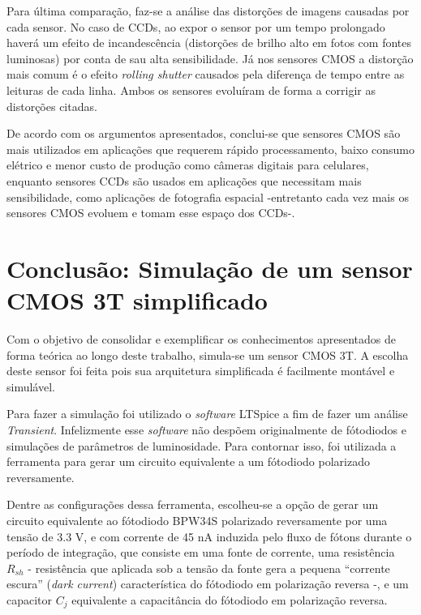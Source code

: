 \documentclass[10pt,a4paper,twocolumn]{article}
\begin{document}
	Para última comparação, faz-se a análise das distorções de imagens causadas por cada sensor. No caso de CCDs, ao expor o sensor por um tempo prolongado haverá um efeito de incandescência (distorções de brilho alto em fotos com fontes luminosas) por conta de sau alta sensibilidade. Já nos sensores CMOS a distorção mais comum é o efeito \textit{rolling shutter} causados pela diferença de tempo entre as leituras de cada linha. Ambos os sensores evoluíram de forma a corrigir as distorções citadas.
	
	De acordo com os argumentos apresentados, conclui-se que sensores CMOS são mais utilizados em aplicações que requerem rápido processamento, baixo consumo elétrico e menor custo de produção como câmeras digitais para celulares, enquanto sensores CCDs são usados em aplicações que necessitam mais sensibilidade, como aplicações de fotografia espacial -entretanto cada vez mais os sensores CMOS evoluem e tomam esse espaço dos CCDs-.
	
	\section*{Conclusão: Simulação de um sensor CMOS 3T simplificado}
	Com o objetivo de consolidar e exemplificar os conhecimentos apresentados de forma teórica ao longo deste trabalho, simula-se um sensor CMOS 3T. A escolha deste sensor foi feita pois sua arquitetura simplificada é facilmente montável e simulável.
		
	Para fazer a simulação foi utilizado o \textit{software} LTSpice a fim de fazer um análise \textit{Transient}. Infelizmente esse \textit{software} não despõem originalmente de fótodiodos e simulações de parâmetros de luminosidade. Para contornar isso, foi utilizada a ferramenta \cite{photodiode} para gerar um circuito equivalente a um fótodiodo polarizado reversamente.
	
	Dentre as configurações dessa ferramenta, escolheu-se a opção de gerar um circuito equivalente ao fótodiodo BPW34S \cite{BPW34} polarizado reversamente por uma tensão de 3.3 V, e com corrente de 45 nA induzida pelo fluxo de fótons durante o período de integração, que consiste em uma fonte de corrente, uma resistência $R_{sh}$ - resistência que aplicada sob a tensão da fonte gera a pequena ``corrente escura'' (\textit{dark current}) característica do fótodiodo em polarização reversa -, e um capacitor $C_{j}$ equivalente a capacitância do fótodiodo em polarização reversa.
	
\end{document}
